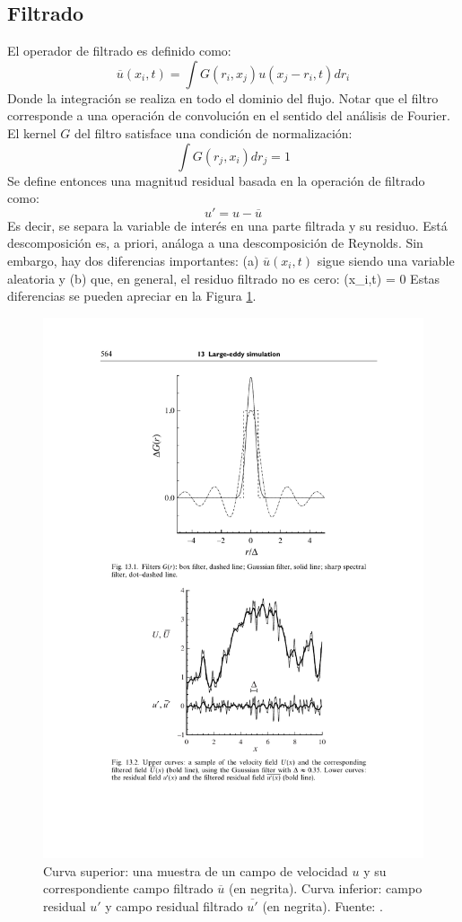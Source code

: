 \subsection{Filtrado}
El operador de filtrado es definido como:
\begin{equation}
\overline{u}(x_i,t) = \int G(r_i,x_j) u(x_j-r_i,t)dr_i
\end{equation}
Donde la integración se realiza en todo el dominio del flujo. Notar que el filtro corresponde a una operación de convolución en el sentido del análisis de Fourier. El kernel $G$ del filtro satisface una condición de normalización:
\begin{equation}
\int G(r_j,x_i)dr_j = 1
\end{equation}
Se define entonces una magnitud residual basada en la operación de filtrado como:
\begin{equation}
u' = u - \overline{u}
\end{equation}
Es decir, se separa la variable de interés en una parte filtrada y su residuo. Está descomposición es, a priori, análoga a una descomposición de Reynolds. Sin embargo, hay dos diferencias importantes: (a) $\overline{u}(x_i,t)$ sigue siendo una variable aleatoria y (b) que, en general, el residuo filtrado no es cero:
\be {}(x_i,t) \not= 0 \ee
Estas diferencias se pueden apreciar en la Figura \ref{fig:03_les}.
\begin{figure}[h!]
	\centering
	\includegraphics[width=0.6\linewidth,trim={4.8cm 4.8cm 2.8cm 12.1cm},clip]{Imagenes/03/les}
	\caption{Curva superior: una muestra de un campo de velocidad $u$ y su correspondiente campo filtrado $\overline{u}$ (en negrita). Curva inferior: campo residual $u'$ y campo residual filtrado $\overline{u'}$ (en negrita). Fuente: \cite{pope2000turbulent}.}
	\label{fig:03_les}
\end{figure}

